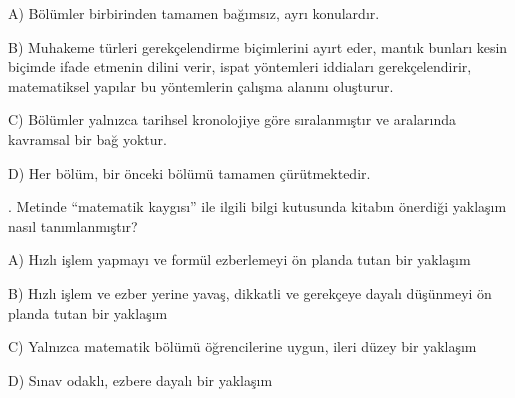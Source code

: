 \par\noindent\hspace*{1.6em}A) Bölümler birbirinden tamamen bağımsız, ayrı konulardır.

\par\noindent\hspace*{1.6em}B) Muhakeme türleri gerekçelendirme biçimlerini ayırt eder, mantık bunları kesin biçimde ifade etmenin dilini verir, ispat yöntemleri iddiaları gerekçelendirir, matematiksel yapılar bu yöntemlerin çalışma alanını oluşturur.

\par\noindent\hspace*{1.6em}C) Bölümler yalnızca tarihsel kronolojiye göre sıralanmıştır ve aralarında kavramsal bir bağ yoktur.

\par\noindent\hspace*{1.6em}D) Her bölüm, bir önceki bölümü tamamen çürütmektedir.

\par\smallskip{}. Metinde “matematik kaygısı” ile ilgili bilgi kutusunda kitabın önerdiği yaklaşım nasıl tanımlanmıştır?

\par\noindent\hspace*{1.6em}A) Hızlı işlem yapmayı ve formül ezberlemeyi ön planda tutan bir yaklaşım

\par\noindent\hspace*{1.6em}B) Hızlı işlem ve ezber yerine yavaş, dikkatli ve gerekçeye dayalı düşünmeyi ön planda tutan bir yaklaşım

\par\noindent\hspace*{1.6em}C) Yalnızca matematik bölümü öğrencilerine uygun, ileri düzey bir yaklaşım

\par\noindent\hspace*{1.6em}D) Sınav odaklı, ezbere dayalı bir yaklaşım

\clearpage

\clearpage